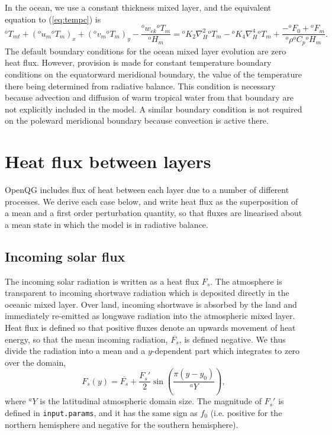 \documentclass[11pt, a4paper,twoside]{article}
\newcommand{\rhb}[1]{{{}^{#1}\rho}}
\newcommand{\cp}[1]{{{}^{#1}C_p}}
\newcommand{\uu}[2]{{{}^{#1}u_{#2}}}
\newcommand{\vv}[2]{{{}^{#1}v_{#2}}}
\newcommand{\ek}[1]{{{}^{#1}w_{ek}}}
\newcommand{\HH}[2]{{{}^{#1}H_{#2}}}
\newcommand{\kh}[1]{{{}^{#1}K_2}}
\newcommand{\kf}[1]{{{}^{#1}K_4}}
\newcommand{\T}[2]{{{}^{#1}T_{#2}}}
\newcommand{\F}[3]{{{}^{#1}F^{#3}_{#2}}}
\numberwithin{equation}{section}
\begin{document}
In the ocean, we use a constant thickness mixed layer, and the equivalent equation to (\ref{eq:tempc}) is
\begin{equation}\label{eq:tempd}
\T{o}{mt} + (\uu{o}{m} \T{o}{m})_x + (\vv{o}{m}  \T{o}{m})_y - \frac{\ek{o}\T{o}{m}}{\HH{o}{m}}  =  \kh{o}  \nabla_H^2 \T{o}{m}  - \kf{o}  \nabla_H^4 \T{o}{m}   + \frac{- \F{o}{0}{} + \F{o}{m}{}}{\rhb{o} \cp{o} \HH{o}{m}}.
\end{equation}
The default boundary conditions for the ocean mixed layer evolution are zero heat flux.
However, provision is made for constant temperature boundary conditions on the equatorward meridional boundary, the value of the temperature there being determined from radiative balance.
This condition is necessary because advection and diffusion of warm tropical water from that boundary are not explicitly included in the model.
A similar boundary condition is not required on the poleward meridional boundary because convection is active there.


\section{Heat flux between layers}\label{sec:flux}
OpenQG includes flux of heat between each layer due to a number of different processes.
We derive each case below, and write heat flux as the superposition of a mean and a first order perturbation quantity, so that fluxes are linearised about a mean state in which the model is in radiative balance.

\subsection{Incoming solar flux}
The incoming solar radiation is written as a heat flux $F_s$.
The atmosphere is transparent to incoming shortwave radiation which is deposited directly in the oceanic mixed layer.
Over land, incoming shortwave is absorbed by the land and immediately re-emitted as longwave radiation into the atmospheric mixed layer.
Heat flux is defined so that positive fluxes denote an upwards movement of heat energy, so that the mean incoming radiation, $\overline{F_s}$, is defined negative.
We thus divide the radiation into a mean and a $y$-dependent part which integrates to zero over the domain,
\begin{equation}\label{eq:fspy}
F_s(y) =  \overline{F_s} + \frac{F_s'}{2} \sin\left( \frac{\pi (y - y_0)}{{}^aY}\right),
\end{equation}
where ${}^aY$ is the latitudinal atmospheric domain size.
The magnitude of $F_s'$ is defined in \verb=input.params=, and it has the same sign as $f_0$ (i.e. positive for the northern hemisphere and negative for the southern hemisphere).
\end{document}
